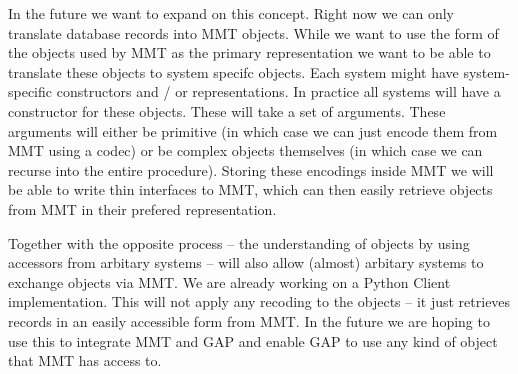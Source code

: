 \documentclass{deliverablereport}
\begin{document}
In the future we want to expand on this concept. Right now we can only translate database records into MMT objects. While we want to use the form of the objects used by MMT as the primary representation we want to be able to translate these objects to system specifc objects. Each system might have system-specific constructors and / or representations. In practice all systems will have a constructor for these objects. These will take a set of arguments. These arguments will either be primitive (in which case we can just encode them from MMT using a codec) or be complex objects themselves (in which case we can recurse into the entire procedure). Storing these encodings inside MMT we will be able to write thin interfaces to MMT, which can then easily retrieve objects from MMT in their prefered representation.

Together with the opposite process -- the understanding of objects by using accessors from arbitary systems -- will also allow (almost) arbitary systems to exchange objects via MMT. We are already working on a Python Client implementation. This will not apply any recoding to the objects -- it just retrieves records in an easily accessible form from MMT. In the future we are hoping to use this to integrate MMT and GAP and enable GAP to use any kind of object that MMT has access to.

\newpage\printbibliography
{}
\end{document}
